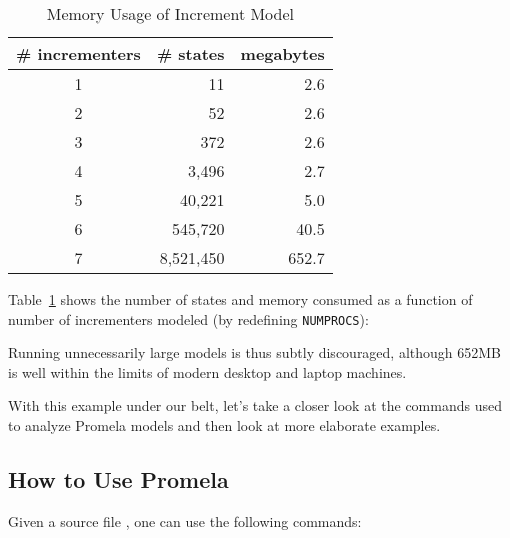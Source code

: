 \begin{table}
\footnotesize
\centering
\begin{tabular}{c|r|r}
	\# incrementers & \# states &	megabytes \\
	\hline
	\hline
	1 &		        11 &          2.6 \\
	\hline
	2 &		        52 &          2.6 \\
	\hline
	3 &		       372 &          2.6 \\
	\hline
	4 &		     3,496 &          2.7 \\
	\hline
	5 &		    40,221 &          5.0 \\
	\hline
	6 &		   545,720 &         40.5 \\
	\hline
	7 &		 8,521,450 &        652.7 \\
\end{tabular}
\caption{Memory Usage of Increment Model}
\label{tab:advsync:Memory Usage of Increment Model}
\end{table}

Table~\ref{tab:advsync:Memory Usage of Increment Model}
shows the number of states and memory consumed
as a function of number of incrementers modeled
(by redefining {\tt NUMPROCS}):

Running unnecessarily large models is thus subtly discouraged, although
652MB is well within the limits of modern desktop and laptop machines.

With this example under our belt, let's take a closer look at the
commands used to analyze Promela models and then look at more
elaborate examples.

\subsection{How to Use Promela}
\label{sec:formal:How to Use Promela}

Given a source file , one can use the following commands:

